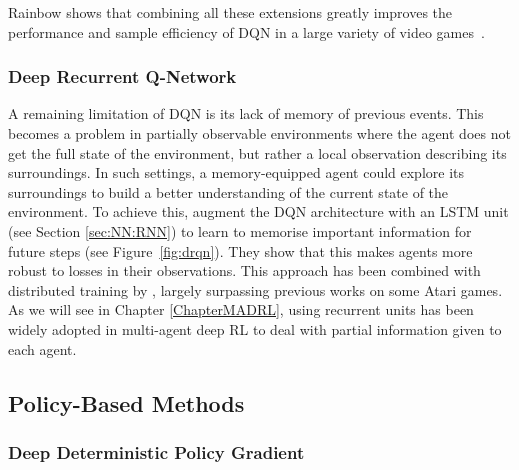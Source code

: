 Rainbow shows that combining all these extensions greatly improves the performance and sample efficiency of DQN in a large variety of video games~\citep{Hessel2018_Rainbow}. 

\subsubsection{Deep Recurrent Q-Network}\label{sec:DRL:DRQN}

A remaining limitation of DQN is its lack of memory of previous events. This becomes a problem in partially observable environments where the agent does not get the full state of the environment, but rather a local observation describing its surroundings. In such settings, a memory-equipped agent could explore its surroundings to build a better understanding of the current state of the environment. To achieve this, \citet{Hausknecht2015_DRQN} augment the DQN architecture with an LSTM unit (see Section \ref{sec:NN:RNN}) to learn to memorise important information for future steps (see Figure~\ref{fig:drqn}). They show that this makes agents more robust to losses in their observations. This approach has been combined with distributed training by \citet{Kapturowski2018_R2D2}, largely surpassing previous works on some Atari games. As we will see in Chapter \ref{ChapterMADRL}, using recurrent units has been widely adopted in multi-agent deep RL to deal with partial information given to each agent. 





\subsection{Policy-Based Methods}\label{sec:DRL:Policy}

\subsubsection{Deep Deterministic Policy Gradient}\label{sec:DRL:DDPG}

